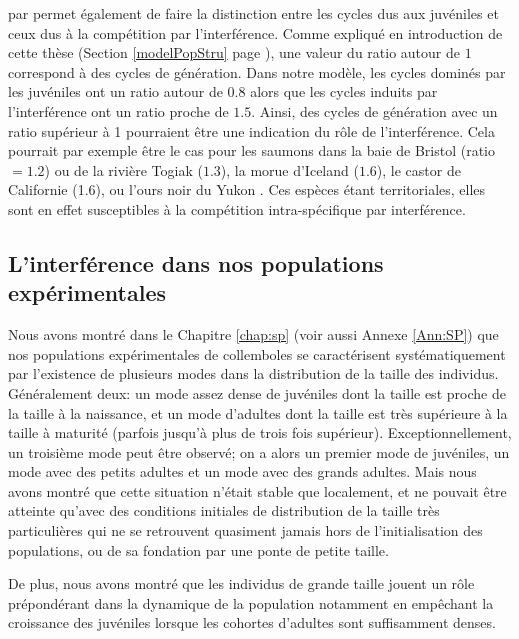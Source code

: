 \begin{enumerate*}[label=(\roman*)]
par \textcites{murdoch2002a} permet également de faire la distinction entre les
cycles dus aux juvéniles et ceux dus à la compétition par l'interférence. Comme
expliqué en introduction de cette thèse (Section \ref{modelPopStru} page
\pageref{modelPopStru}), une valeur du ratio autour de $1$ correspond à des
cycles de génération. Dans notre modèle, les cycles dominés par les juvéniles
ont un ratio autour de $0.8$ alors que les cycles induits par l'interférence ont
un ratio proche de $1.5$. Ainsi, des cycles de génération avec un ratio
supérieur à 1 pourraient être une indication du rôle de l'interférence. Cela
pourrait par exemple être le cas pour les saumons dans la baie de Bristol
(ratio$=1.2$) ou de la rivière Togiak ($1.3$), la morue d'Iceland ($1.6$), le
castor de Californie (1.6), ou l'ours noir du Yukon
\autocites[1.5,][]{murdoch2002a}. Ces espèces étant territoriales, elles sont en
effet susceptibles à la compétition intra-spécifique par interférence.
\end{enumerate*}

\subsection{L'interférence dans nos populations expérimentales}

Nous avons montré dans le Chapitre \ref{chap:sp} (voir aussi Annexe
\ref{Ann:SP}) que nos populations expérimentales de collemboles se caractérisent
systématiquement par l'existence de plusieurs modes dans la distribution de la
taille des individus.
Généralement deux: un mode assez dense de juvéniles dont la taille est proche de
la taille à la naissance, et un mode d'adultes dont la taille est très
supérieure à la taille à maturité (parfois jusqu'à plus de trois fois
supérieur). Exceptionnellement, un troisième mode peut être observé; on a alors
un premier mode de juvéniles, un mode avec des petits adultes et un mode avec
des grands adultes. Mais nous avons montré que cette situation n'était stable
que localement, et ne pouvait être atteinte qu'avec des conditions initiales de
distribution de la taille très particulières qui ne se retrouvent quasiment
jamais hors de l'initialisation des populations, ou de sa fondation par une
ponte de petite taille.

De plus, nous avons montré que les individus de grande taille jouent un rôle
prépondérant dans la dynamique de la population notamment en empêchant la
croissance des juvéniles lorsque les cohortes d'adultes sont suffisamment
denses. 

